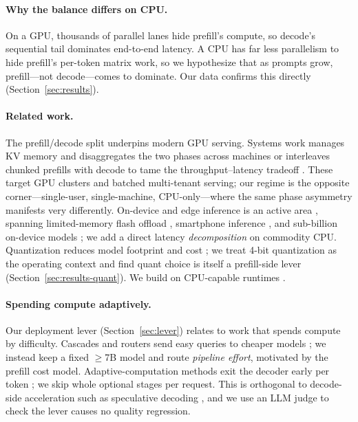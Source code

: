 \documentclass[10pt,twocolumn]{article}
\begin{document}
\paragraph{Why the balance differs on CPU.}
On a GPU, thousands of parallel lanes hide prefill's compute, so decode's
sequential tail dominates end-to-end latency. A CPU has far less
parallelism to hide prefill's per-token matrix work, so we hypothesize
that as prompts grow, prefill---not decode---comes to dominate. Our data
confirms this directly (Section~\ref{sec:results}).

\paragraph{Related work.}
The prefill/decode split underpins modern GPU serving. Systems work
manages KV memory \cite{kwon2023pagedattention} and disaggregates the two
phases across machines \cite{patel2024splitwise, zhong2024distserve} or
interleaves chunked prefills with decode to tame the throughput--latency
tradeoff \cite{agrawal2024sarathi}. These target GPU clusters and batched
multi-tenant serving; our regime is the opposite corner---single-user,
single-machine, CPU-only---where the same phase asymmetry manifests very
differently. On-device and edge inference is an active area
\cite{xu2024ondevicereview}, spanning limited-memory flash offload
\cite{alizadeh2024llmflash}, smartphone inference \cite{xue2024powerinfer2},
and sub-billion on-device models \cite{liu2024mobilellm}; we add a direct
latency \emph{decomposition} on commodity CPU. Quantization reduces model
footprint and cost \cite{dettmers2022llmint8, frantar2023gptq,
xiao2023smoothquant, lin2024awq}; we treat 4-bit quantization as the
operating context and find quant choice is itself a prefill-side lever
(Section~\ref{sec:results-quant}). We build on CPU-capable runtimes
\cite{gerganov2023llamacpp, shen2023efficientcpu}.

\paragraph{Spending compute adaptively.}
Our deployment lever (Section~\ref{sec:lever}) relates to work that spends
compute by difficulty. Cascades and routers send easy queries to cheaper
models \cite{chen2023frugalgpt, ong2024routellm}; we instead keep a fixed
$\geq$7B model and route \emph{pipeline effort}, motivated by the prefill
cost model. Adaptive-computation methods exit the decoder early per token
\cite{schuster2022calm}; we skip whole optional stages per request. This is
orthogonal to decode-side acceleration such as speculative decoding
\cite{leviathan2023speculative}, and we use an LLM judge
\cite{zheng2023judging} to check the lever causes no quality regression.
\end{document}

